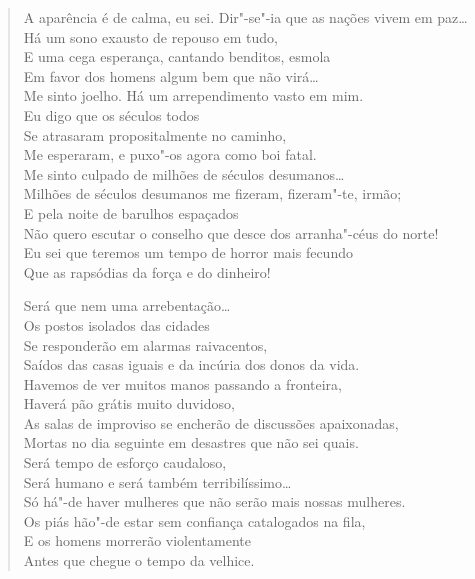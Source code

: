 {\begin{verse}
A aparência é de calma, eu sei. Dir"-se"-ia que as nações vivem em paz\ldots{}\\
Há um sono exausto de repouso em tudo,\\
E uma cega esperança, cantando benditos, esmola\\
Em favor dos homens algum bem que não virá\ldots{}\\
Me sinto joelho. Há um arrependimento vasto em mim.\\
Eu digo que os séculos todos\\
Se atrasaram propositalmente no caminho,\\
Me esperaram, e puxo"-os agora como boi fatal.\\
Me sinto culpado de milhões de séculos desumanos\ldots{}\\
Milhões de séculos desumanos me fizeram, fizeram"-te, irmão;\\
E pela noite de barulhos espaçados\\
Não quero escutar o conselho que desce dos arranha"-céus do norte!\\
Eu sei que teremos um tempo de horror mais fecundo\\
Que as rapsódias da força e do dinheiro!

Será que nem uma arrebentação\ldots{}\\
Os postos isolados das cidades\\
Se responderão em alarmas raivacentos,\\
Saídos das casas iguais e da incúria dos donos da vida.\\
Havemos de ver muitos manos passando a fronteira,\\
Haverá pão grátis muito duvidoso,\\
As salas de improviso se encherão de discussões apaixonadas,\\
Mortas no dia seguinte em desastres que não sei quais.\\
Será tempo de esforço caudaloso,\\
Será humano e será também terribilíssimo\ldots{}\\
Só há"-de haver mulheres que não serão mais nossas mulheres.\\
Os piás hão"-de estar sem confiança catalogados na fila,\\
E os homens morrerão violentamente\\
Antes que chegue o tempo da velhice.
\end{verse}


}
